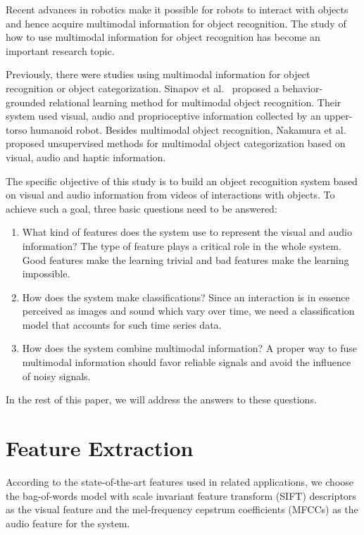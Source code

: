 \documentclass[letterpaper, 10 pt, conference]{ieeeconf}
\begin{document}
Recent advances in robotics make it possible for robots to interact with objects and hence acquire multimodal information for object recognition. The study of how to use multimodal information for object recognition has become an important research topic.

Previously, there were studies using multimodal information for object recognition or object categorization. Sinapov et al.~\cite{sinapov_object_2011}\cite{sinapov_learning_2014} proposed a behavior-grounded relational learning method for multimodal object recognition. Their system used visual, audio and proprioceptive information collected by an upper-torso humanoid robot. Besides multimodal object recognition, Nakamura et al.~\cite{nakamura_multimodal_2007}\cite{nakamura_bag_2012} proposed unsupervised methods for multimodal object categorization based on visual, audio and haptic information.

The specific objective of this study is to build an object recognition system based on visual and audio information from videos of interactions with objects. To achieve such a goal, three basic questions need to be answered:
\begin{enumerate}
  \item What kind of features does the system use to represent the visual and audio information? The type of feature plays a critical role in the whole system. Good features make the learning trivial and bad features make the learning impossible.
  \item How does the system make classifications? Since an interaction is in essence perceived as images and sound which vary over time, we need a classification model that accounts for such time series data.
  \item How does the system combine multimodal information? A proper way to fuse multimodal information should favor reliable signals and avoid the influence of noisy signals.
\end{enumerate}

In the rest of this paper, we will address the answers to these questions.

\section{Feature Extraction}
According to the state-of-the-art features used in related applications, we choose the bag-of-words model with scale invariant feature transform (SIFT) descriptors as the visual feature and the mel-frequency cepstrum coefficients (MFCCs) as the audio feature for the system.
\end{document}
